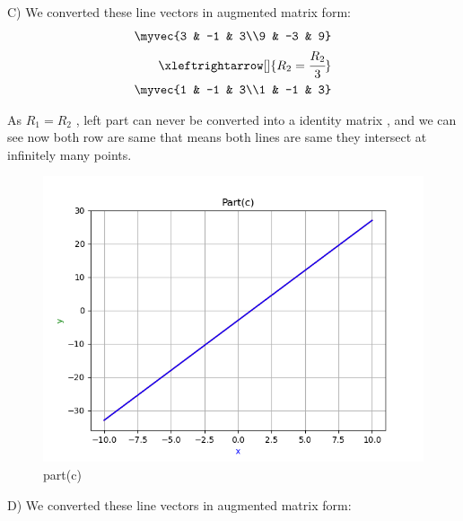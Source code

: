 \begin{enumerate}[label=\thesection.\arabic*.,ref=\thesection.\theenumi]
C)
We converted these line vectors in augmented matrix form:\\ 

\begin{align*}
    \myvec{3 & -1 & 3\\9 & -3 & 9}
\\
    \xleftrightarrow[]{R_{2}=\cfrac{R_{2}}{3}}
\\
    \myvec{1 & -1 & 3\\1 & -1 & 3}
\end{align*}

As $R_{1}=R_{2}$ , left part can never be converted into a identity matrix , and we can see now both row are same that means both lines are same they intersect at infinitely many points.\\

\renewcommand{\thefigure}{\theenumi.\arabic{figure}}
\begin{figure}[!ht]
    \centering
    \includegraphics[width=\columnwidth]{./figures/A1_partc}
\caption{part(c)}
\label{fig: part(c)}
\end{figure}

D)
We converted these line vectors in augmented matrix form:\\ 


\end{enumerate}
